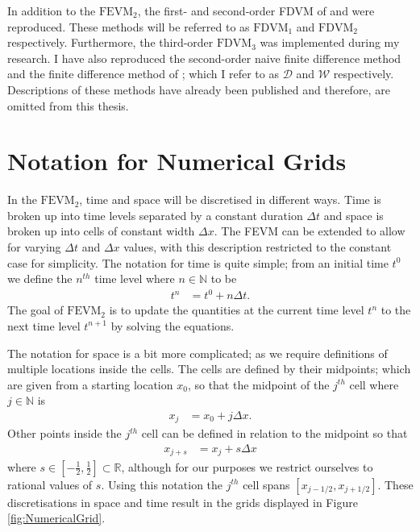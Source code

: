  
In addition to the $\text{FEVM}_2$, the first- and second-order FDVM of \citet{Hank-etal-2010-2034} and \citet{Zoppou-etal-2017} were reproduced. These methods will be referred to as $\text{FDVM}_1$ and $\text{FDVM}_2$ respectively. Furthermore, the third-order $\text{FDVM}_3$ was implemented during my research. I have also reproduced the second-order naive finite difference method \cite{Pitt-J-2014} and the finite difference method of \citet{El-etal-2006}; which I refer to as $\mathcal{D}$ and $\mathcal{W}$ respectively. Descriptions of these methods have already been published \cite{Zoppou-etal-2017,Pitt-2018-61} and therefore, are omitted from this thesis.


\section{Notation for Numerical Grids}

In the $\text{FEVM}_2$, time and space will be discretised in different ways. Time is broken up into time levels separated by a constant duration $\Delta t$ and space is broken up into cells of constant width $\Delta x$. The FEVM can be extended to allow for varying $\Delta t$ and $\Delta x$ values, with this description restricted to the constant case for simplicity. The notation for time is quite simple; from an initial time $t^0$ we define the $n^{th}$ time level where $n \in \mathbb{N}$ to be
\begin{align*}
t^n &= t^0 + n \Delta t.
\end{align*}
The goal of $\text{FEVM}_2$ is to update the quantities at the current time level $t^n$ to the next time level $t^{n+1}$ by solving the equations. 

The notation for space is a bit more complicated; as we require definitions of multiple locations inside the cells. The cells are defined by their midpoints; which are given from a starting location $x_0$, so that the midpoint of the $j^{th}$ cell where $j \in \mathbb{N}$ is
\begin{align*}
x_j &= x_0 + j \Delta x.
\end{align*}
Other points inside the $j^{th}$ cell can be defined in relation to the midpoint so that 
\begin{align*}
x_{j + s} &= x_j + s \Delta x
\end{align*}
where $s \in \left[-\frac{1}{2} , \frac{1}{2}\right] \subset\mathbb{R}$, although for our purposes we restrict ourselves to rational values of $s$. Using this notation the $j^{th}$ cell spans $\left[x_{j -1/2},x_{j + 1/2}\right]$. These discretisations in space and time result in the grids displayed in Figure \ref{fig:NumericalGrid}.

